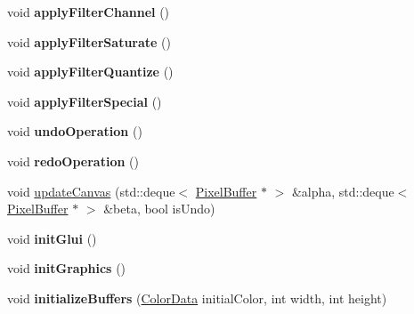 \begin{DoxyCompactItemize}
\item 
\hypertarget{classFlashPhotoApp_a8c8d8c714d059083f49e1e0cd1336321}{void {\bfseries apply\-Filter\-Channel} ()}\label{classFlashPhotoApp_a8c8d8c714d059083f49e1e0cd1336321}

\item 
\hypertarget{classFlashPhotoApp_aabd2e2b487ebe038cbcbfa700d5951f9}{void {\bfseries apply\-Filter\-Saturate} ()}\label{classFlashPhotoApp_aabd2e2b487ebe038cbcbfa700d5951f9}

\item 
\hypertarget{classFlashPhotoApp_a5a9c62db1aa83250b4f95c94f5dac762}{void {\bfseries apply\-Filter\-Quantize} ()}\label{classFlashPhotoApp_a5a9c62db1aa83250b4f95c94f5dac762}

\item 
\hypertarget{classFlashPhotoApp_a7b1664e842e4a0a16cf7c340e126de17}{void {\bfseries apply\-Filter\-Special} ()}\label{classFlashPhotoApp_a7b1664e842e4a0a16cf7c340e126de17}

\item 
\hypertarget{classFlashPhotoApp_ad33153aceb1cca61bb682c00ae8e22ff}{void {\bfseries undo\-Operation} ()}\label{classFlashPhotoApp_ad33153aceb1cca61bb682c00ae8e22ff}

\item 
\hypertarget{classFlashPhotoApp_aad1a00932e723e17c39f6959c42d9f5f}{void {\bfseries redo\-Operation} ()}\label{classFlashPhotoApp_aad1a00932e723e17c39f6959c42d9f5f}

\item 
void \hyperlink{classFlashPhotoApp_af90d307fdc027a037816a63757a17120}{update\-Canvas} (std\-::deque$<$ \hyperlink{classPixelBuffer}{Pixel\-Buffer} $\ast$ $>$ \&alpha, std\-::deque$<$ \hyperlink{classPixelBuffer}{Pixel\-Buffer} $\ast$ $>$ \&beta, bool is\-Undo)
\item 
\hypertarget{classFlashPhotoApp_a8360b752328c423d850d819361e18a12}{void {\bfseries init\-Glui} ()}\label{classFlashPhotoApp_a8360b752328c423d850d819361e18a12}

\item 
\hypertarget{classFlashPhotoApp_a9a786ee86c70c142fd957421f9354996}{void {\bfseries init\-Graphics} ()}\label{classFlashPhotoApp_a9a786ee86c70c142fd957421f9354996}

\item 
\hypertarget{classFlashPhotoApp_afed06134c0c49494fb5055a93dc8423f}{void {\bfseries initialize\-Buffers} (\hyperlink{classColorData}{Color\-Data} initial\-Color, int width, int height)}\label{classFlashPhotoApp_afed06134c0c49494fb5055a93dc8423f}


\end{DoxyCompactItemize}
